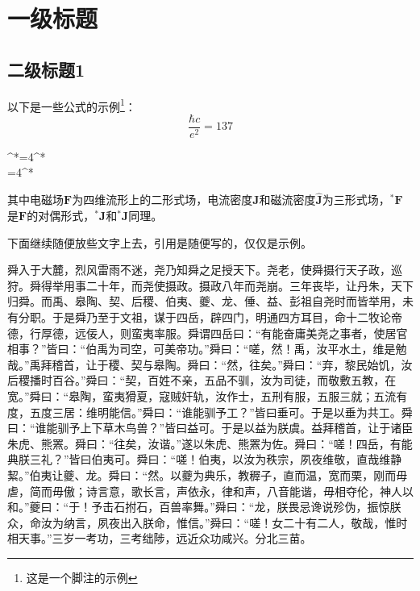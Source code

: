 \documentclass[UTF8,12pt,AutoFakeBold]{ctexart}
\begin{document}
	
	\newpage
	
	\section{一级标题\label{章节：正文部分}}
	\subsection{二级标题1\label{章节：二级标题1}}
	
	
	以下是一些公式的示例\footnote{这是一个脚注的示例}：
	\begin{equation}
		\frac{\hbar c}{e^2}=137
	\end{equation}
	\begin{subnumcases}{\label{式：绪论|对称的麦克斯韦方程组}}
		^*\!=4\pi^*\!\!\\
		=4\pi^*\!\!
	\end{subnumcases}
	其中电磁场$\bm{F}$为四维流形上的二形式场，电流密度$\bm{J}$和磁流密度$\hat{\bm{J}}$为三形式场，$^*\!\bm{F}$是$\bm{F}$的对偶形式，$^*\!\!\bm{J}$和$^*\!\!\hat{\bm{J}}$同理。
	\par
	下面继续随便放些文字上去，引用是随便写的，仅仅是示例。
	\par
	舜入于大麓，烈风雷雨不迷\cite{HOOFT1974276,PismaZhETF.20.430}，尧乃知舜之足授天下。尧老，使舜摄行天子政，巡狩。舜得举用事二十年，而尧使摄政。摄政八年而尧崩\cite{1975CMaPh..43..199H}。三年丧毕，让丹朱，天下归舜。而禹、皋陶、契、后稷、伯夷、夔、龙、倕、益、彭祖自尧时而皆举用，未有分职。于是舜乃至于文祖，谋于四岳，辟四门，明通四方耳目，命十二牧论帝德，行厚德，远佞人，则蛮夷率服。舜谓四岳曰：“有能奋庸美尧之事者，使居官相事？”皆曰：“伯禹为司空，可美帝功。”舜曰：“嗟，然！禹，汝平水土，维是勉哉。”禹拜稽首，让于稷、契与皋陶。舜曰：“然，往矣。”舜曰：“弃，黎民始饥，汝后稷播时百谷。”舜曰：“契，百姓不亲，五品不驯，汝为司徒\cite{PhysRevLett.43.1365,ZELDOVICH1978239,Weinberg_2012}，而敬敷五教，在宽。”舜曰：“皋陶，蛮夷猾夏，寇贼奸轨，汝作士，五刑有服，五服三就；五流有度，五度三居：维明能信。”舜曰：“谁能驯予工？”皆曰垂可。于是以垂为共工。舜曰：“谁能驯予上下草木鸟兽？”皆曰益可。于是以益为朕虞。益拜稽首，让于诸臣朱虎、熊罴。舜曰：“往矣，汝谐。”遂以朱虎、熊罴为佐。舜曰：“嗟！四岳，有能典朕三礼？”皆曰伯夷可。舜曰：“嗟！伯夷，以汝为秩宗，夙夜维敬，直哉维静絜。”伯夷让夔、龙。舜曰：“然。以夔为典乐，教稺子，直而温，宽而栗，刚而毋虐，简而毋傲；诗言意，歌长言，声依永，律和声，八音能谐，毋相夺伦，神人以和。”夔曰：“于！予击石拊石，百兽率舞。”舜曰：“龙，朕畏忌谗说殄伪，振惊朕众，命汝为纳言，夙夜出入朕命，惟信。”舜曰：“嗟！女二十有二人，敬哉，惟时相天事。”三岁一考功，三考绌陟，远近众功咸兴。分北三苗。
\end{document}
